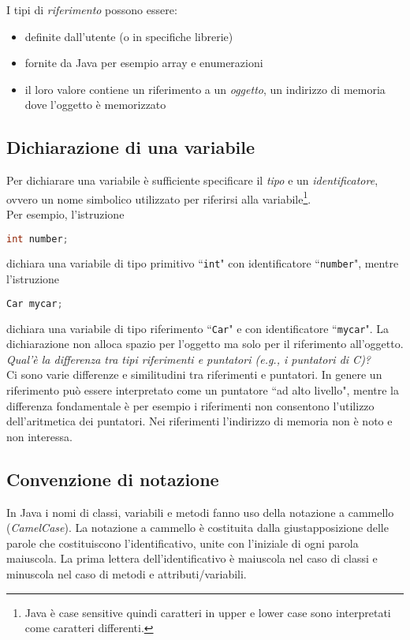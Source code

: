 \documentclass{article}
\begin{document}
I tipi di \emph{riferimento} possono essere:
\begin{itemize}
\item definite dall'utente (o in specifiche librerie)
\item fornite da Java per esempio array e enumerazioni
\item il loro valore contiene un riferimento a un \emph{oggetto}, un indirizzo di memoria dove l'oggetto è memorizzato
\end{itemize}

\subsection{Dichiarazione di una variabile}
Per dichiarare una variabile è sufficiente specificare il \emph{tipo} e un \emph{identificatore}, ovvero un nome simbolico utilizzato per riferirsi alla variabile\footnote{Java è case sensitive quindi caratteri in upper e lower case sono interpretati come caratteri differenti.}. \\
Per esempio, l'istruzione
\begin{lstlisting}[language=Java,escapechar=|]
int number;
\end{lstlisting}
dichiara una variabile di tipo primitivo ``\texttt{int}" con identificatore ``\texttt{number}", mentre l'istruzione
\begin{lstlisting}[language=Java,escapechar=|]
Car mycar;
\end{lstlisting}
dichiara una variabile di tipo riferimento ``\texttt{Car}" e con identificatore ``\texttt{mycar}".
La dichiarazione non alloca spazio per l'oggetto ma solo per il riferimento all'oggetto. \\

\emph{Qual'è la differenza tra tipi riferimenti e puntatori (e.g., i puntatori di C)?}\\
Ci sono varie differenze e similitudini tra riferimenti e puntatori. In genere un riferimento può essere interpretato come un puntatore ``ad alto livello", mentre la differenza fondamentale è per esempio i riferimenti non consentono l'utilizzo dell'aritmetica dei puntatori. Nei riferimenti l'indirizzo di memoria non è noto e non interessa.

\subsection{Convenzione di notazione}
In Java i nomi di classi, variabili e metodi fanno uso della notazione a cammello (\emph{CamelCase}).
La notazione a cammello è costituita dalla giustapposizione delle parole che costituiscono l'identificativo, unite con l'iniziale di ogni parola maiuscola. 
La prima lettera dell'identificativo è maiuscola nel caso di classi e minuscola nel caso di metodi e attributi/variabili. 
\end{document}
